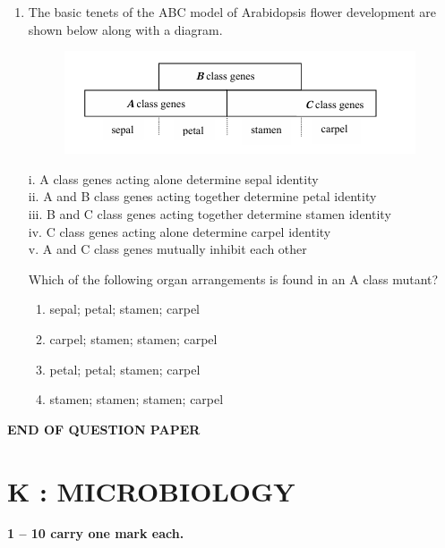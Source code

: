 \documentclass[journal,12pt,onecolumn]{IEEEtran}
\begin{document}
\begin{enumerate}[label=\arabic*.,resume]
\item The basic tenets of the ABC model of Arabidopsis flower development are shown below along with a diagram.\\
\begin{figure}[H]
\centering
\includegraphics[width=0.7\columnwidth]{FIG/J-20.png}
\caption*{}
\label{fig:J-20}
\end{figure}
i. A class genes acting alone determine sepal identity \\
ii. A and B class genes acting together determine petal identity \\
iii. B and C class genes acting together determine stamen identity \\
iv. C class genes acting alone determine carpel identity \\
v. A and C class genes mutually inhibit each other

Which of the following organ arrangements is found in an A class mutant?

\begin{multicols}{2}
\begin{enumerate}[label=(\Alph*)]
\item sepal; petal; stamen; carpel
\item carpel; stamen; stamen; carpel
\item petal; petal; stamen; carpel
\item stamen; stamen; stamen; carpel
\end{enumerate}
\end{multicols}

\end{enumerate}

\begin{center}
\textbf{END OF QUESTION PAPER}
\end{center}
\newpage
\section*{\centering K : MICROBIOLOGY}

\noindent \textbf{ 1 -- 10 carry one mark each.}
\end{document}
